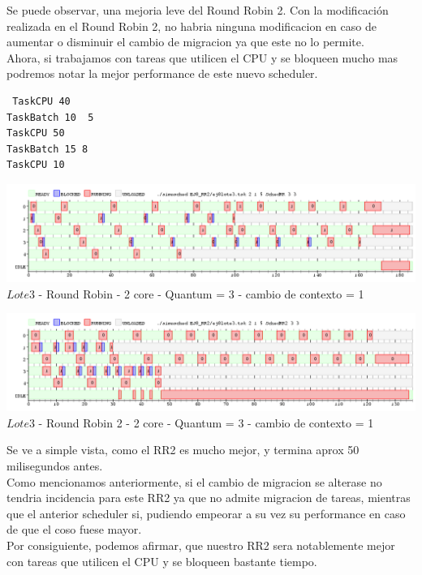  
\indent Se puede observar, una mejoria leve del Round Robin 2. Con la modificación realizada en el Round Robin 2,
no habria ninguna modificacion en caso de aumentar o disminuir el cambio de migracion ya que este no lo permite.\\

\indent Ahora, si trabajamos con tareas que utilicen el CPU y se bloqueen mucho mas podremos notar la mejor performance
de este nuevo scheduler.\\

\begin{verbatim}
 TaskCPU 40
TaskBatch 10  5
TaskCPU 50
TaskBatch 15 8
TaskCPU 10

\end{verbatim}


   \begin{center}
    	\includegraphics[width=450pt]{./EJ8_RR2/dif5corerr.png}
	{$Lote 3$ - Round Robin - 2 core - Quantum = 3 - cambio de contexto = 1}	
 \end{center}
 
 \begin{center}
    	\includegraphics[width=450pt]{./EJ8_RR2/dif5corerr2.png}
	{$Lote 3$ - Round Robin 2 - 2 core - Quantum = 3 - cambio de contexto = 1}	
 \end{center}

 \indent Se ve a simple vista, como el RR2 es mucho mejor, y termina aprox 50 milisegundos antes.\\
 Como mencionamos anteriormente, si el cambio de migracion se alterase no tendria incidencia para este RR2 ya que 
 no admite migracion de tareas, mientras que el anterior scheduler si, pudiendo empeorar a su vez su performance en caso
 de que el coso fuese mayor.\\
 
 \indent Por consiguiente, podemos afirmar, que nuestro RR2 sera notablemente mejor con tareas que utilicen el CPU y se bloqueen
 bastante tiempo.\\
 
